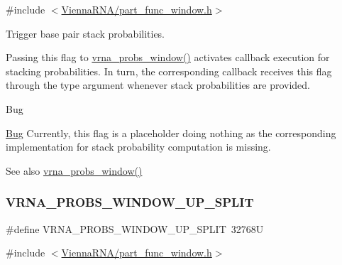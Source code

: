 {\ttfamily \#include $<$\hyperlink{part__func__window_8h}{Vienna\+R\+N\+A/part\+\_\+func\+\_\+window.\+h}$>$}



Trigger base pair stack probabilities. 

Passing this flag to \hyperlink{group__part__func__window_ga7115d012988541a65ec323c5f17a334b}{vrna\+\_\+probs\+\_\+window()} activates callback execution for stacking probabilities. In turn, the corresponding callback receives this flag through the {\ttfamily type} argument whenever stack probabilities are provided.

\begin{DoxyRefDesc}{Bug}
\item[\hyperlink{bug__bug000001}{Bug}]Currently, this flag is a placeholder doing nothing as the corresponding implementation for stack probability computation is missing.\end{DoxyRefDesc}


\begin{DoxySeeAlso}{See also}
\hyperlink{group__part__func__window_ga7115d012988541a65ec323c5f17a334b}{vrna\+\_\+probs\+\_\+window()} 
\end{DoxySeeAlso}
\mbox{\label{group__part__func__window_ga9068f4ec008bf1c042a9357f5c2c5e13}} 
\subsubsection{\texorpdfstring{V\+R\+N\+A\+\_\+\+P\+R\+O\+B\+S\+\_\+\+W\+I\+N\+D\+O\+W\+\_\+\+U\+P\+\_\+\+S\+P\+L\+IT}{VRNA\_PROBS\_WINDOW\_UP\_SPLIT}}
{\footnotesize\ttfamily \#define V\+R\+N\+A\+\_\+\+P\+R\+O\+B\+S\+\_\+\+W\+I\+N\+D\+O\+W\+\_\+\+U\+P\+\_\+\+S\+P\+L\+IT~32768U}



{\ttfamily \#include $<$\hyperlink{part__func__window_8h}{Vienna\+R\+N\+A/part\+\_\+func\+\_\+window.\+h}$>$}




